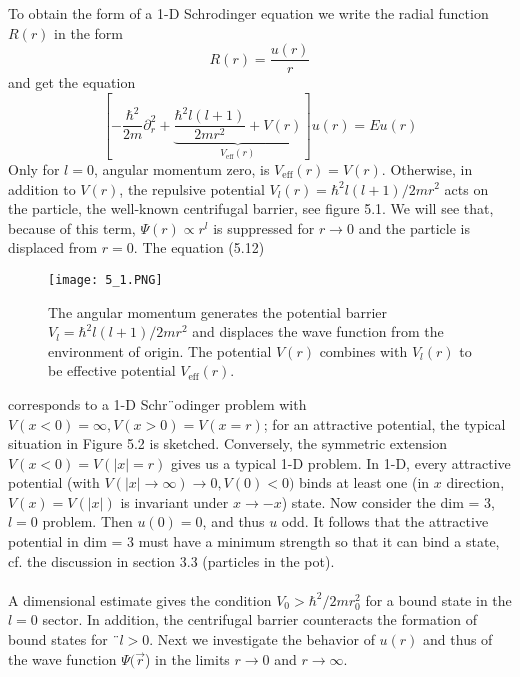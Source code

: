 To obtain the form of a 1-D Schrodinger equation we write the radial function $R (r)$ in the form
\begin{equation}
    R(r)=\frac{u(r)}{r}
    \end{equation}
and get the equation
\begin{equation}
    \left[-\frac{\hbar^{2}}{2 m} \partial_{r}^{2}+\underbrace{\frac{\hbar^{2} l(l+1)}{2 m r^{2}}+V(r)}_{V_{\mathrm{eff}}(r)}\right] u(r)=E u(r)
    \end{equation}
Only for $l = 0$, angular momentum zero, is $V_{\text{eff}} (r) = V (r)$. Otherwise, in addition to $V (r)$, the repulsive potential $V_l (r) = \hbar^2l(l+1) / 2m r^2$ acts on the particle, the well-known centrifugal barrier, see figure 5.1. We will see that, because of this term, $\Psi(r)\propto r^l$ is suppressed for $r \rightarrow 0$ and the particle is displaced from $r = 0$. The equation (5.12)
\begin{figure}[ht]
    \begin{minipage}{0.5\textwidth}
        \centering
        \texttt{[image: 5\_1.PNG]}
    \end{minipage}
    \begin{minipage}{0.5\textwidth}
        \caption{The angular momentum generates
        the potential barrier $V_l=\hbar^2l(l+1)/2mr^2$ and displaces the wave function from the environment of origin. The potential $V (r)$ combines with $V_l (r)$ to be effective potential $V_{\text{eff}} (r)$.}
    \end{minipage}
\end{figure}
corresponds to a 1-D Schr¨odinger problem with $V (x <0) = \infty, V (x> 0) = V (x = r)$; for an attractive potential, the typical situation in Figure 5.2 is sketched. Conversely, the symmetric extension $V (x <0) = V (| x | = r)$ gives us a typical 1-D problem. In 1-D, every attractive potential (with $V (| x |\rightarrow \infty) \rightarrow 0, V (0) <0)$ binds at least one (in $x$ direction, $V (x) = V (| x |)$ is invariant under $x \rightarrow -x$) state. Now consider the dim = 3, $l = 0$ problem. Then $u (0) = 0$, and thus $u$ odd. It follows that the attractive potential in dim = 3 must have a minimum strength so that it can bind a state, cf. the discussion in section 3.3 (particles in the pot).\\\\
A dimensional estimate gives the condition $V_0>\hbar^2/2mr_0^2$ for a bound state in the $l = 0$ sector. In addition, the centrifugal barrier counteracts the formation of bound states for ¨$l> 0$. Next we investigate the behavior of $u (r)$ and thus of the wave function $ \Psi (\vec{r}$) in the limits $r \rightarrow 0$ and $r \rightarrow \infty$.

